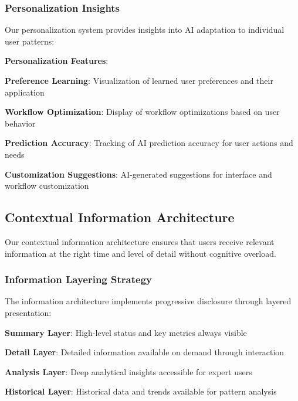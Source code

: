 \subsubsection*{Personalization Insights}

Our personalization system provides insights into AI adaptation to individual user patterns:

\begin{successbox}
\textbf{Personalization Features}:
\begin{compactlist}
    \item \textbf{Preference Learning}: Visualization of learned user preferences and their application
    \item \textbf{Workflow Optimization}: Display of workflow optimizations based on user behavior
    \item \textbf{Prediction Accuracy}: Tracking of AI prediction accuracy for user actions and needs
    \item \textbf{Customization Suggestions}: AI-generated suggestions for interface and workflow customization
\end{compactlist}
\end{successbox}

\subsection*{Contextual Information Architecture}

Our contextual information architecture ensures that users receive relevant information at the right time and level of detail without cognitive overload.

\subsubsection*{Information Layering Strategy}

The information architecture implements progressive disclosure through layered presentation:

\begin{expandedlist}
    \item \textbf{Summary Layer}: High-level status and key metrics always visible
    \item \textbf{Detail Layer}: Detailed information available on demand through interaction
    \item \textbf{Analysis Layer}: Deep analytical insights accessible for expert users
    \item \textbf{Historical Layer}: Historical data and trends available for pattern analysis
\end{expandedlist}

